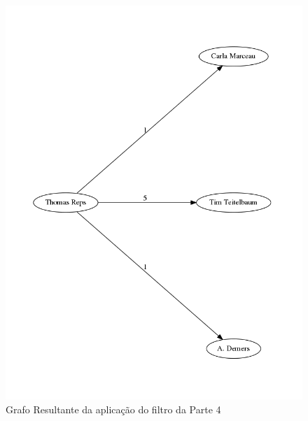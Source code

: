 \begin{figure}[hbtp]
	\centering
  \includegraphics[scale=0.5]{testes/out.png}
	\caption{Grafo Resultante da aplicação do filtro da Parte 4}
	\label{fig:d1}
\end{figure}










